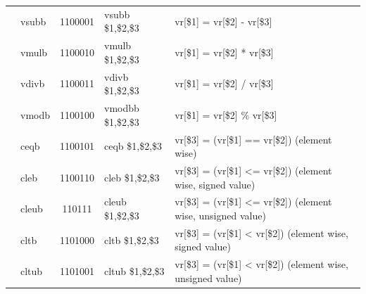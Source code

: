 \documentclass{sig-alternate}
\begin{document}
\begin{table}[p]
\begin{tabular}{|c|l|c|l|p{8cm}|}
 & vsubb & 1100001 & vsubb \$1,\$2,\$3 & vr[\$1] = vr[\$2] - vr[\$3]  \\ \cline{2-5}  
 & vmulb & 1100010 & vmulb \$1,\$2,\$3 & vr[\$1] = vr[\$2] * vr[\$3]  \\ \cline{2-5}
 & vdivb & 1100011 & vdivb \$1,\$2,\$3 & vr[\$1] = vr[\$2] / vr[\$3]  \\ \cline{2-5}
 & vmodb & 1100100 & vmodbb \$1,\$2,\$3 & vr[\$1] = vr[\$2] \% vr[\$3] \\ \cline{2-5}
 & ceqb & 1100101 & ceqb \$1,\$2,\$3 & vr[\$3] = (vr[\$1] == vr[\$2]) (element wise)\\ \cline{2-5}  
 & cleb & 1100110 & cleb \$1,\$2,\$3&vr[\$3] = (vr[\$1] <= vr[\$2]) (element wise, signed value)  \\ \cline{2-5}
 & cleub & 110111 & cleub \$1,\$2,\$3 & vr[\$3] = (vr[\$1] <= vr[\$2]) (element wise, unsigned value) \\ \cline{2-5}
 & cltb & 1101000 & cltb \$1,\$2,\$3 & vr[\$3] = (vr[\$1] < vr[\$2]) (element wise, signed value) \\ \cline{2-5}
 & cltub & 1101001 & cltub \$1,\$2,\$3 &vr[\$3] = (vr[\$1] < vr[\$2]) (element wise, unsigned value) \\ \hline
\end{tabular}
\end{table}
\end{document}
